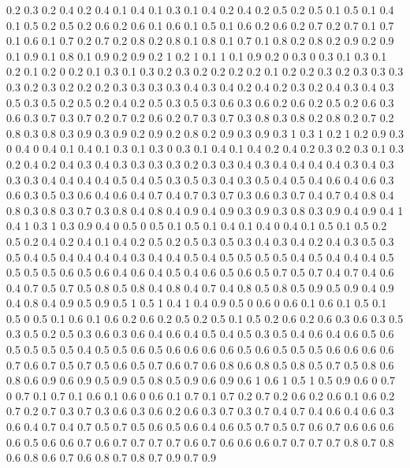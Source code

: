0.2 0.3
0.2 0.4
0.2 0.4
0.1 0.4
0.1 0.3
0.1 0.4
0.2 0.4
0.2 0.5
0.2 0.5
0.1 0.5
0.1 0.4
0.1 0.5
0.2 0.5
0.2 0.6
0.2 0.6
0.1 0.6
0.1 0.5
0.1 0.6
0.2 0.6
0.2 0.7
0.2 0.7
0.1 0.7
0.1 0.6
0.1 0.7
0.2 0.7
0.2 0.8
0.2 0.8
0.1 0.8
0.1 0.7
0.1 0.8
0.2 0.8
0.2 0.9
0.2 0.9
0.1 0.9
0.1 0.8
0.1 0.9
0.2 0.9
0.2 1
0.2 1
0.1 1
0.1 0.9
0.2 0
0.3 0
0.3 0.1
0.3 0.1
0.2 0.1
0.2 0
0.2 0.1
0.3 0.1
0.3 0.2
0.3 0.2
0.2 0.2
0.2 0.1
0.2 0.2
0.3 0.2
0.3 0.3
0.3 0.3
0.2 0.3
0.2 0.2
0.2 0.3
0.3 0.3
0.3 0.4
0.3 0.4
0.2 0.4
0.2 0.3
0.2 0.4
0.3 0.4
0.3 0.5
0.3 0.5
0.2 0.5
0.2 0.4
0.2 0.5
0.3 0.5
0.3 0.6
0.3 0.6
0.2 0.6
0.2 0.5
0.2 0.6
0.3 0.6
0.3 0.7
0.3 0.7
0.2 0.7
0.2 0.6
0.2 0.7
0.3 0.7
0.3 0.8
0.3 0.8
0.2 0.8
0.2 0.7
0.2 0.8
0.3 0.8
0.3 0.9
0.3 0.9
0.2 0.9
0.2 0.8
0.2 0.9
0.3 0.9
0.3 1
0.3 1
0.2 1
0.2 0.9
0.3 0
0.4 0
0.4 0.1
0.4 0.1
0.3 0.1
0.3 0
0.3 0.1
0.4 0.1
0.4 0.2
0.4 0.2
0.3 0.2
0.3 0.1
0.3 0.2
0.4 0.2
0.4 0.3
0.4 0.3
0.3 0.3
0.3 0.2
0.3 0.3
0.4 0.3
0.4 0.4
0.4 0.4
0.3 0.4
0.3 0.3
0.3 0.4
0.4 0.4
0.4 0.5
0.4 0.5
0.3 0.5
0.3 0.4
0.3 0.5
0.4 0.5
0.4 0.6
0.4 0.6
0.3 0.6
0.3 0.5
0.3 0.6
0.4 0.6
0.4 0.7
0.4 0.7
0.3 0.7
0.3 0.6
0.3 0.7
0.4 0.7
0.4 0.8
0.4 0.8
0.3 0.8
0.3 0.7
0.3 0.8
0.4 0.8
0.4 0.9
0.4 0.9
0.3 0.9
0.3 0.8
0.3 0.9
0.4 0.9
0.4 1
0.4 1
0.3 1
0.3 0.9
0.4 0
0.5 0
0.5 0.1
0.5 0.1
0.4 0.1
0.4 0
0.4 0.1
0.5 0.1
0.5 0.2
0.5 0.2
0.4 0.2
0.4 0.1
0.4 0.2
0.5 0.2
0.5 0.3
0.5 0.3
0.4 0.3
0.4 0.2
0.4 0.3
0.5 0.3
0.5 0.4
0.5 0.4
0.4 0.4
0.4 0.3
0.4 0.4
0.5 0.4
0.5 0.5
0.5 0.5
0.4 0.5
0.4 0.4
0.4 0.5
0.5 0.5
0.5 0.6
0.5 0.6
0.4 0.6
0.4 0.5
0.4 0.6
0.5 0.6
0.5 0.7
0.5 0.7
0.4 0.7
0.4 0.6
0.4 0.7
0.5 0.7
0.5 0.8
0.5 0.8
0.4 0.8
0.4 0.7
0.4 0.8
0.5 0.8
0.5 0.9
0.5 0.9
0.4 0.9
0.4 0.8
0.4 0.9
0.5 0.9
0.5 1
0.5 1
0.4 1
0.4 0.9
0.5 0
0.6 0
0.6 0.1
0.6 0.1
0.5 0.1
0.5 0
0.5 0.1
0.6 0.1
0.6 0.2
0.6 0.2
0.5 0.2
0.5 0.1
0.5 0.2
0.6 0.2
0.6 0.3
0.6 0.3
0.5 0.3
0.5 0.2
0.5 0.3
0.6 0.3
0.6 0.4
0.6 0.4
0.5 0.4
0.5 0.3
0.5 0.4
0.6 0.4
0.6 0.5
0.6 0.5
0.5 0.5
0.5 0.4
0.5 0.5
0.6 0.5
0.6 0.6
0.6 0.6
0.5 0.6
0.5 0.5
0.5 0.6
0.6 0.6
0.6 0.7
0.6 0.7
0.5 0.7
0.5 0.6
0.5 0.7
0.6 0.7
0.6 0.8
0.6 0.8
0.5 0.8
0.5 0.7
0.5 0.8
0.6 0.8
0.6 0.9
0.6 0.9
0.5 0.9
0.5 0.8
0.5 0.9
0.6 0.9
0.6 1
0.6 1
0.5 1
0.5 0.9
0.6 0
0.7 0
0.7 0.1
0.7 0.1
0.6 0.1
0.6 0
0.6 0.1
0.7 0.1
0.7 0.2
0.7 0.2
0.6 0.2
0.6 0.1
0.6 0.2
0.7 0.2
0.7 0.3
0.7 0.3
0.6 0.3
0.6 0.2
0.6 0.3
0.7 0.3
0.7 0.4
0.7 0.4
0.6 0.4
0.6 0.3
0.6 0.4
0.7 0.4
0.7 0.5
0.7 0.5
0.6 0.5
0.6 0.4
0.6 0.5
0.7 0.5
0.7 0.6
0.7 0.6
0.6 0.6
0.6 0.5
0.6 0.6
0.7 0.6
0.7 0.7
0.7 0.7
0.6 0.7
0.6 0.6
0.6 0.7
0.7 0.7
0.7 0.8
0.7 0.8
0.6 0.8
0.6 0.7
0.6 0.8
0.7 0.8
0.7 0.9
0.7 0.9
